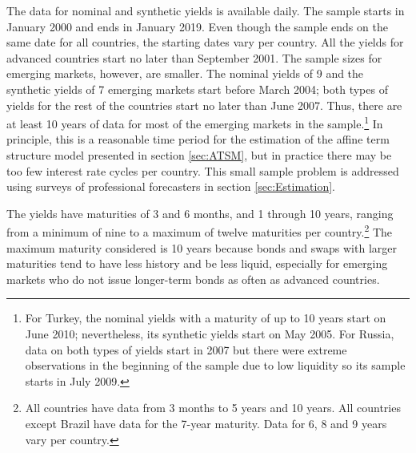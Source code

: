 {The data for nominal and synthetic yields is available daily. 
The sample starts in January 2000 and ends in January 2019.
Even though the sample ends on the same date for all countries, the starting dates 
vary per country.
All the yields for advanced countries start no later than September 2001.
The sample sizes for emerging markets, however, are smaller.
The nominal yields of 9 and the synthetic yields of 7 emerging markets start before March 2004; both types of yields for the rest of the countries start no later than June 2007.
Thus, there are at least 10 years of data for most of the emerging markets in the sample.\footnote{ For Turkey, the nominal yields with a maturity of up to 10 years start on June 2010; nevertheless, its synthetic yields start on May 2005. For Russia, data on both types of yields start in 2007 but there were extreme observations in the beginning of the sample due to low liquidity so its sample starts in July 2009.}
In principle, this is a reasonable time period for the estimation of the affine term structure model presented in section \ref{sec:ATSM}, but in practice there may be too few interest rate cycles per country.
This small sample problem is addressed using surveys of professional forecasters in section \ref{sec:Estimation}. 

The yields have maturities of 3 and 6 months, and 1 through 10 years, ranging from a minimum of nine to a maximum of twelve maturities per country.\footnote{ All countries have data from 3 months to 5 years and 10 years. All countries except Brazil have data for the 7-year maturity. Data for 6, 8 and 9 years vary per country.} 
The maximum maturity considered is 10 years because bonds and swaps with larger maturities tend to have less history and be less liquid, especially for emerging markets who do not issue longer-term bonds as often as advanced countries.
%	

}
